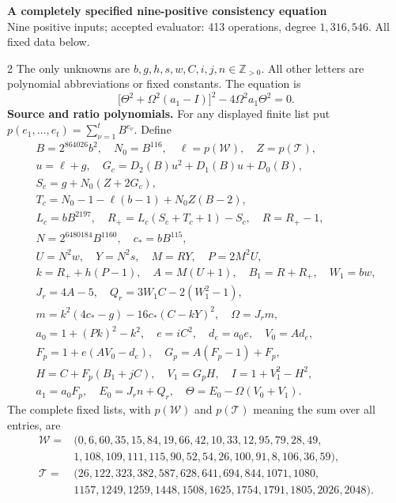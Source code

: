 \documentclass[10pt]{article}
\let\bigsum\sum
\renewcommand{\sum}{\bigsum\nolimits}
\begin{document}
\noindent\parbox{\textwidth}{\centering
{\large\bfseries A completely specified nine-positive consistency equation}\\[-1pt]
{\small Nine positive inputs; accepted evaluator: 413 operations, degree $1{,}316{,}546$. All fixed data below.}}\par
\begin{multicols}{2}
\fontsize{9}{9.0}\selectfont
The only unknowns are $b,g,h,s,w,C,i,j,n\in\mathbb Z_{>0}$.
All other letters are polynomial abbreviations or fixed constants.
The equation is
\[
\boxed{\bigl[\Theta^2+\Omega^2(a_1-I)\bigr]^2
       -4\Omega^2a_1\Theta^2=0.}
\]
\textbf{Source and ratio polynomials.} For any displayed finite list put
$p(e_1,\ldots,e_t)=\sum_{\nu=1}^{t}B^{e_\nu}$. Define
\[
\begin{gathered}
B=2^{864026}b^2,\quad N_0=B^{116},\quad\ell=p(\mathcal W),\quad Z=p(\mathcal T),\\
u=\ell+g,\quad G_c=D_2(B)u^2+D_1(B)u+D_0(B),\\
S_c=g+N_0(Z+2G_c),\\
T_c=N_0-1-\ell(b-1)+N_0Z(B-2),\\
L_c=bB^{2197},\quad R_+=L_c(S_c+T_c+1)-S_c,\quad R=R_+-1,\\
N=2^{6480184}B^{1160},\quad c_*=bB^{115},\\
U=N^2w,\quad Y=N^2s,\quad M=RY,\quad P=2M^2U,\\
k=R_++h(P-1),\quad A=M(U+1),\quad B_1=R+R_+,\quad W_1=bw,\\
J_r=4A-5,\quad Q_r=3W_1C-2(W_1^2-1),\\
m=k^2(4c_*-g)-16c_*(C-kY)^2,\quad\Omega=J_rm,\\
a_0=1+(Pk)^2-k^2,\quad e=iC^2,\quad d_e=a_0e,\quad V_0=Ad_e,\\
F_p=1+e(AV_0-d_e),\quad G_p=A(F_p-1)+F_p,\\
H=C+F_p(B_1+jC),\quad V_1=G_pH,\quad I=1+V_1^2-H^2,\\
a_1=a_0F_p,\quad E_0=J_rn+Q_r,\quad\Theta=E_0-\Omega(V_0+V_1).
\end{gathered}
\]
The complete fixed lists, with $p(\mathcal W)$ and $p(\mathcal T)$ meaning
the sum over all entries, are
\[
\begin{aligned}
\mathcal W={}&(0,6,60,35,15,84,19,66,42,10,33,12,95,79,28,49,\\
 &1,108,109,111,115,90,52,54,26,100,91,8,106,36,59),\\
\mathcal T={}&(26,122,323,382,587,628,641,694,844,1071,1080,\\
 &1157,1249,1259,1448,1508,1625,1754,1791,1805,2026,2048).

\end{aligned}\]
\end{multicols}
\end{document}
